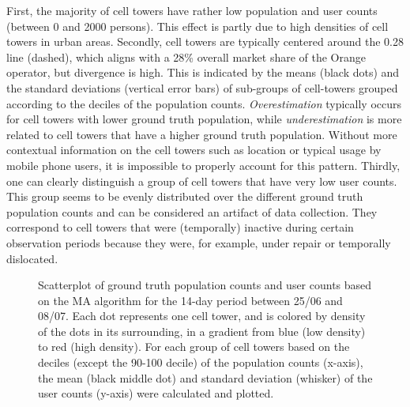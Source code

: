 \documentclass[a4paper]{article}
\begin{document}
First, the majority of cell towers have rather low population and user counts (between 0 and 2000 persons). This effect is partly due to high densities of cell towers in urban areas. 
Secondly, cell towers are typically centered around the 0.28 line (dashed), which aligns with a 28\% overall market share of the Orange operator, but divergence is high. This is indicated by the means (black dots) and the standard deviations (vertical error bars) of sub-groups of cell-towers grouped according to the deciles of the population counts. \textit{Overestimation} typically occurs for cell towers with lower ground truth population, while \textit{underestimation} is more related to cell towers that have a higher ground truth population. Without more contextual information on the cell towers such as location or typical usage by mobile phone users, it is impossible to properly account for this pattern.
Thirdly, one can clearly distinguish a group of cell towers that have very low user counts. This group seems to be evenly distributed over the different ground truth population counts and can be considered an artifact of data collection. They correspond to cell towers that were (temporally) inactive during certain observation periods because they were, for example, under repair or temporally dislocated. 


\begin{figure}[htbp!]
\centering
\caption{Scatterplot of ground truth population counts and user counts based on the MA algorithm for the 14-day period between 25/06 and 08/07. Each dot represents one cell tower, and is colored by density of the dots in its surrounding, in a gradient from blue (low density) to red (high density). For each group of cell towers based on the deciles (except the 90-100 decile) of the population counts (x-axis), the mean (black middle dot) and standard deviation (whisker) of the user counts (y-axis) were calculated and plotted.}
\label{fig:scatterplot}
\end{figure}
\end{document}
